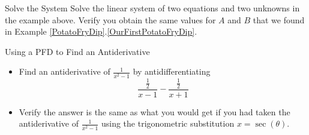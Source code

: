 \begin{exercise}{Solve the System \Coffeecup}
Solve the linear system of two equations and two unknowns in the example above.  Verify you obtain the same values for $A$ and $B$ that we found in Example \ref{PotatoFryDip}.\ref{OurFirstPotatoFryDip}.
\vspace*{1in}
\end{exercise}
\begin{exercise}{Using a PFD to Find an Antiderivative \Coffeecup \Coffeecup } \begin{itemize}
\item  Find an antiderivative of $\frac{1}{x^2-1}$ by antidifferentiating $$\frac{\frac{1}{2}}{x-1}-\frac{\frac{1}{2}}{x+1}$$
\item Verify the answer is the same as what you would get if you had taken the antiderivative of  $\frac{1}{x^2-1}$ using the trigonometric substitution $x=\sec(\theta)$.
\end{itemize}
\end{exercise}
